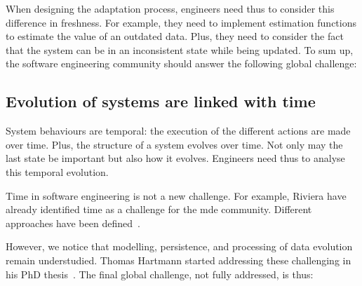 When designing the adaptation process, engineers need thus to consider this difference in freshness.
For example, they need to implement estimation functions to estimate the value of an outdated data.
Plus, they need to consider the fact that the system can be in an inconsistent state while being updated.
To sum up, the software engineering community should answer the following global challenge:
\vspace{-2em}

\subsection{Evolution of systems are linked with time}
\label{intro:challenges:evol-syst}
System behaviours are temporal: the execution of the different actions are made over time.
Plus, the structure of a system evolves over time.
Not only may the last state be important but also how it evolves.
Engineers need thus to analyse this temporal evolution.

Time in software engineering is not a new challenge.
For example, Riviera \etal \cite{DBLP:conf/models/RiveraRV08} have already identified time as a challenge for the \gls{mde} community.
Different approaches have been defined~\cite{DBLP:conf/sle/BousseCCGB15, DBLP:conf/sle/KansoT12, DBLP:conf/icse/KoegelH10, DBLP:conf/seke/0001FNMKT14}.

However, we notice that modelling, persistence, and processing of data evolution remain understudied.
Thomas Hartmann started addressing these challenging in his PhD thesis~\cite{DBLP:phd/basesearch/Hartmann16}.
The final global challenge, not fully addressed, is thus:
\vspace{-2em}
